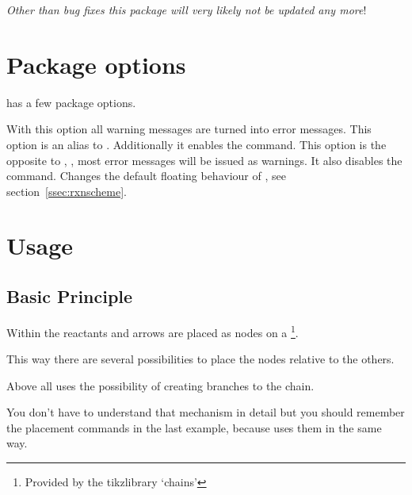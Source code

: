 \documentclass[toc=index,DIV10]{cnpkgdoc}
\begin{document}
\emph{Other than bug fixes this package will very likely \emph{not} be updated
any more}!

\section{Package options}\label{sec:paketoptionen}
\mychemistry has a few package options.
\begin{beschreibung}
   With this option all warning messages are turned into error
    messages.
   This option is an alias to . Additionally it enables
    the  command.
   This option is the opposite to , \ie, most error
    messages will be issued as warnings. It also disables the 
    command.
   Changes the default floating behaviour of ,
    see section~\ref{ssec:rxnscheme}.
\end{beschreibung}

\section{Usage}
\subsection{Basic Principle}
Within the  reactants and arrows are placed as nodes on a
\footnote{Provided by the tikzlibrary `chains'}.

\begin{beispiel}
\end{beispiel}
This way there are several possibilities to place the nodes relative to the others.
\begin{beispiel}
\end{beispiel}

Above all \mychemistry uses the possibility of creating branches to the chain.
\begin{beispiel}
\end{beispiel}
You don't have to understand that mechanism in detail but you should remember the
placement commands in the last example, because \mychemistry uses them in the same
way.
\end{document}
